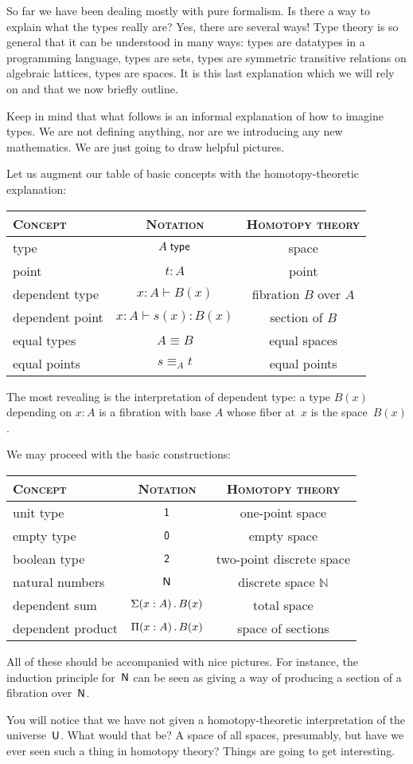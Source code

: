 \documentclass{amsart}
\begin{document}
So far we have been dealing mostly with pure formalism. Is there a way to
explain what the types really are? Yes, there are several ways! Type theory is
so general that it can be understood in many ways: types are datatypes in a
programming language, types are sets, types are symmetric transitive relations
on algebraic lattices, types are spaces. It is this last explanation which we
will rely on and that we now briefly outline.

Keep in mind that what follows is an informal explanation of how to imagine
types. We are not defining anything, nor are we introducing any new mathematics.
We are just going to draw helpful pictures.

Let us augment our table of basic concepts with the homotopy-theoretic explanation:
%
\begin{center}
\begin{tabular}{lcc}
  \toprule
  \textsc{Concept} & \textsc{Notation} & \textsc{Homotopy theory} \\
  \midrule
  type             & $A\; \mathsf{type}$ & space \\
  point            & $t : A$ & point \\
  dependent type   & $x : A \vdash B(x)$ & fibration $B$ over $A$\\
  dependent point  & $x : A \vdash s(x) : B(x)$ & section of $B$ \\
  equal types      & $A \equiv B$ & equal spaces \\
  equal points     & $s \equiv_A t$ & equal points  \\
  \bottomrule
\end{tabular}
\end{center}
%
The most revealing is the interpretation of dependent type: a type $B(x)$
depending on $x : A$ is a fibration with base $A$ whose fiber at~$x$ is the
space~$B(x)$.

We may proceed with the basic constructions:
%
\begin{center}
\begin{tabular}{lcc}
  \toprule
  \textsc{Concept} & \textsc{Notation} & \textsc{Homotopy theory} \\
  \midrule
  unit type        & $\mathsf{1}$    & one-point space \\
  empty type       & $\mathsf{0}$   & empty space \\
  boolean type     & $\mathsf{2}$   & two-point discrete space \\
  natural numbers  & $\mathsf{N}$     & discrete space $\mathbb{N}$ \\
  dependent sum    & $\Sigma(x : A) \,.\, B(x)$ & total space \\
  dependent product & $\Pi(x : A) \,.\, B(x)$ & space of sections \\
  \bottomrule
\end{tabular}
\end{center}
%
All of these should be accompanied with nice pictures. For instance, the
induction principle for~$\mathsf{N}$ can be seen as giving a way of producing a
section of a fibration over~$\mathsf{N}$.

You will notice that we have not given a homotopy-theoretic interpretation of
the universe~$\mathsf{U}$. What would that be? A space of all spaces, presumably, but
have we ever seen such a thing in homotopy theory? Things are going to get
interesting.



\end{document}
